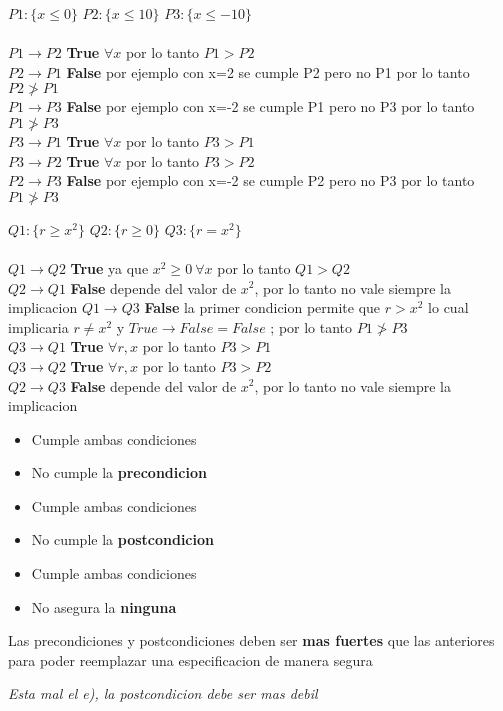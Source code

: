 \documentclass{article}
\begin{document}
\begin{itemize}
    \item [a) ] \Large{$P1:\{x\leq0\}$ $P2:\{x\leq10\}$ $P3:\{x\leq-10\}$\\\\
    $P1\to P2$ \textbf{True} $\forall x$ por lo tanto $P1>P2$\\
    $P2\to P1$ \textbf{False} por ejemplo con x=2 se cumple P2 pero no P1 por lo tanto $P2\ngtr P1$\\
    $P1\to P3$ \textbf{False} por ejemplo con x=-2 se cumple P1 pero no P3 por lo tanto $P1\ngtr P3$\\
    $P3\to P1$ \textbf{True} $\forall x$ por lo tanto $P3>P1$\\
    $P3\to P2$ \textbf{True} $\forall x$ por lo tanto $P3>P2$\\
    $P2\to P3$ \textbf{False} por ejemplo con x=-2 se cumple P2 pero no P3 por lo tanto $P1\ngtr P3$\\
    \item [b) ] \Large{$Q1:\{r\geq x^2\}$ $Q2:\{r\geq0\}$ $Q3:\{r=x^2\}$\\\\
    $Q1\to Q2$ \textbf{True} ya que $x^2\geq0\ \forall x$ por lo tanto $Q1>Q2$\\
    $Q2\to Q1$ \textbf{False} depende del valor de $x^2$, por lo tanto no vale siempre la implicacion
    $Q1\to Q3$ \textbf{False} la primer condicion permite que $r>x^2$ lo cual implicaria $r\neq x^2$ y $True\to False=False$ ; por lo tanto $P1\ngtr P3$\\
    $Q3\to Q1$ \textbf{True} $\forall r,x$ por lo tanto $P3>P1$\\
    $Q3\to Q2$ \textbf{True} $\forall r,x$ por lo tanto $P3>P2$\\
    $Q2\to Q3$ \textbf{False} depende del valor de $x^2$, por lo tanto no vale siempre la implicacion\\}
    \item [d) ]
    \begin{itemize}
        \item [i) ] Cumple ambas condiciones
        \item[ii) ] No cumple la \textbf{precondicion}
        \item[iii) ] Cumple ambas condiciones
        \item[iv) ] No cumple la \textbf{postcondicion}
        \item[v) ] Cumple ambas condiciones
        \item[vi) ] No asegura la \textbf{ninguna}
    \end{itemize}
    \item [e) ] Las precondiciones y postcondiciones deben ser \textbf{mas fuertes} que las anteriores para poder reemplazar una especificacion de manera segura}
    \large\textit{{Esta mal el e), la postcondicion debe ser mas debil}}\\
\end{itemize}
\end{document}

